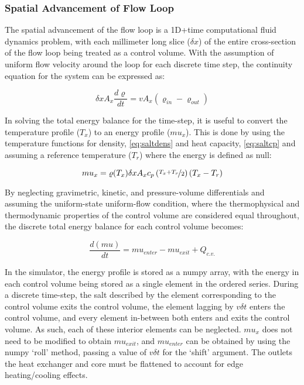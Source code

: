 \subsubsection{Spatial Advancement of Flow Loop}
The spatial advancement of the flow loop is a 1D+time computational fluid dynamics problem, with each millimeter long slice ($\delta x$) of the entire cross-section of the flow loop being treated as a control volume. With the assumption of uniform flow velocity around the loop for each discrete time step, the continuity equation for the system can be expressed as:

\begin{equation}
    \delta x A_x \frac{d\varrho}{dt} = v A_x(\varrho_{in}-\varrho_{out})
\end{equation}

In solving the total energy balance for the time-step, it is useful to convert the temperature profile ($T_x$) to an energy profile ($mu_x$). This is done by using the temperature functions for density, \ref{eq:saltdens}  and heat capacity, \ref{eq:saltcp} and assuming a reference temperature ($T_r$) where the energy is defined as null:

\begin{equation}\label{eq:T2mu}
    mu_x = \varrho(T_x)\delta x A_x c_p\left(\nicefrac{T_x+T_r}{2}\right)(T_x-T_r) 
\end{equation}

By neglecting gravimetric, kinetic, and pressure-volume differentials and assuming the uniform-state uniform-flow condition, where the thermophysical and thermodynamic properties of the control volume are considered equal throughout, the discrete total energy balance for each control volume becomes:

\begin{equation}
    \frac{d(mu)}{dt} = mu_{enter} - mu_{exit} + Q_{c.v.}
\end{equation}

In the simulator, the energy profile is stored as a numpy array, with the energy in each control volume being stored as a single element in the ordered series. During a discrete time-step, the salt described by the element corresponding to the control volume exits the control volume, the element lagging by $v\delta t$ enters the control volume, and every element in-between both enters and exits the control volume. As such, each of these interior elements can be neglected. $mu_x$ does not need to be modified to obtain $mu_{exit}$, and $mu_{enter}$ can be obtained by using the numpy `roll' method, passing a value of $v\delta t$ for the `shift' argument. The outlets the heat exchanger and core must be flattened to account for edge heating/cooling effects. 

